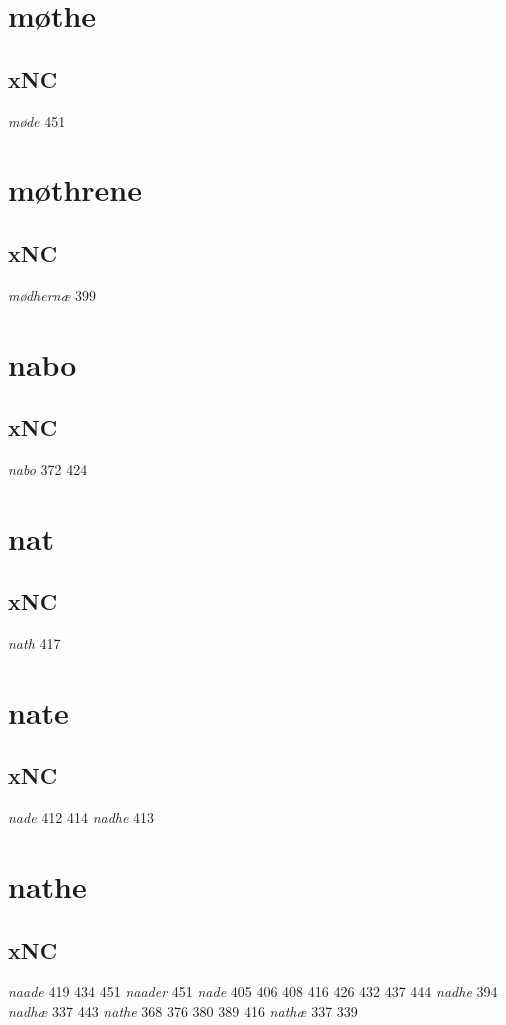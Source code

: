 \documentclass[a4paper,twocolumn]{article}
\begin{document}
\section{møthe}
\label{sec:orgc3bfb6a}
\subsection{xNC}
\label{sec:org07a369f}
\emph{møde} 451 
\section{møthrene}
\label{sec:org798aff1}
\subsection{xNC}
\label{sec:org2fde1dc}
\emph{mødhernæ} 399 
\section{nabo}
\label{sec:org7814355}
\subsection{xNC}
\label{sec:org8471a75}
\emph{nabo} 372 424 
\section{nat}
\label{sec:orgde0a4e8}
\subsection{xNC}
\label{sec:org3d89b8b}
\emph{nath} 417 
\section{nate}
\label{sec:orgc341d39}
\subsection{xNC}
\label{sec:orgd97eeb8}
\emph{nade} 412 414 \emph{nadhe} 413 
\section{nathe}
\label{sec:org8de273c}
\subsection{xNC}
\label{sec:org78ec35f}
\emph{naade} 419 434 451 \emph{naader} 451 \emph{nade} 405 406 408 416 426 432 437 444 \emph{nadhe} 394 \emph{nadhæ} 337 443 \emph{nathe} 368 376 380 389 416 \emph{nathæ} 337 339 
\end{document}

